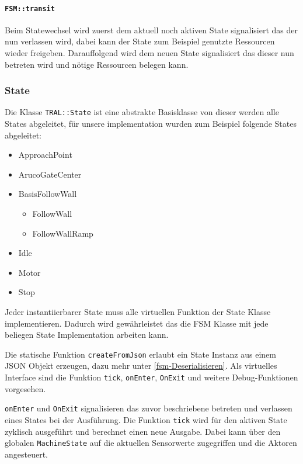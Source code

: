 \paragraph{\texttt{FSM::transit}}

Beim Statewechsel wird zuerst dem aktuell noch aktiven State signalisiert das der nun verlassen wird, dabei kann der State
zum Beispiel genutzte Ressourcen wieder freigeben. Darauffolgend wird dem neuen State signalisiert das dieser nun betreten wird und nötige Ressourcen belegen kann.


\subsubsection{State}
Die Klasse \texttt{TRAL::State} ist eine abstrakte Basisklasse von dieser werden alle States abgeleitet, für unsere implementation wurden zum Beispiel folgende States abgeleitet:

\begin{itemize}
	\item ApproachPoint
	\item ArucoGateCenter
	\item BasisFollowWall
	\begin{itemize}
		\item FollowWall
		\item FollowWallRamp
	\end{itemize}
	\item Idle
	\item Motor
	\item Stop
\end{itemize}

Jeder instantiierbarer State muss alle virtuellen Funktion der State Klasse implementieren. Dadurch wird gewährleistet das die FSM Klasse mit jede beliegen State Implementation arbeiten kann.

Die statische Funktion \texttt{createFromJson} erlaubt ein State Instanz aus einem JSON Objekt erzeugen, dazu mehr unter \ref{fsm-Deserialisieren}. Als virtuelles Interface sind die Funktion \texttt{tick}, \texttt{onEnter}, \texttt{OnExit} und weitere Debug-Funktionen vorgesehen.

\texttt{onEnter} und \texttt{OnExit} signalisieren das zuvor beschriebene betreten und verlassen eines States bei der Ausführung. Die Funktion \texttt{tick} wird für den aktiven State zyklisch ausgeführt und berechnet einen neue Ausgabe. Dabei kann über den globalen \texttt{MachineState} auf die aktuellen Sensorwerte zugegriffen und die Aktoren angesteuert.


